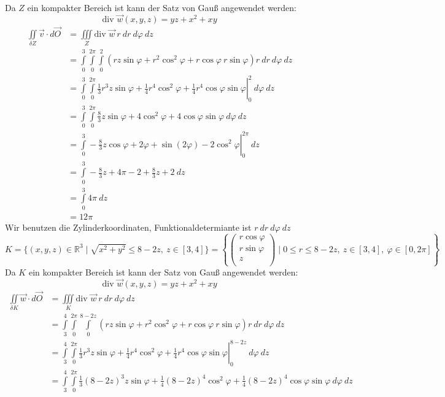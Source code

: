 \documentclass[10pt,a4paper,parskip=half]{scrartcl}
\newcommand{\R}{\mathbb{R}}
\newcommand{\vecthree}[3]{\begin{pmatrix}#1\\#2\\#3\\\end {pmatrix}}
\begin{document}
\begin{enumerate}[(a)]
   Da $Z$ ein kompakter Bereich ist kann der Satz von Gauß angewendet werden:
   \[ \text{div } \vec w(x,y,z) =  yz + x^2 + xy\]
      \begin{align*}
            \iint\limits_{\delta Z} \vec v \cdot d \vec O &= \iiint\limits_{Z} \text{div } \vec w~ r~dr ~d\varphi~ dz \\
            &= \int\limits_{0}^3\int\limits_0^{2\pi}\int\limits_0^2  (rz\sin\varphi + r^2\cos^2\varphi + r\cos\varphi ~r\sin\varphi )r~dr ~d\varphi~ dz \\
            &= \left.\int\limits_{0}^3\int\limits_0^{2\pi}  \frac 13 r^3z \sin \varphi + \frac 14 r^4 \cos^2 \varphi + \frac 14 r^4 \cos \varphi \sin \varphi \right|^2_0  ~d\varphi ~ dz  \\
            &= \int\limits_{0}^3\int\limits_0^{2\pi} \frac 83 z \sin \varphi + 4\cos^2 \varphi + 4\cos \varphi \sin \varphi ~d\varphi ~dz \\
            &= \left.\int\limits_0^3 -\frac 83  z \cos \varphi + 2\varphi + \sin (2\varphi ) - 2\cos^2\varphi \right|^{2\pi}_0 ~dz\\
            &= \int\limits_0^3 - \frac 83 z + 4\pi - 2 + \frac 83z + 2 ~dz \\
            &= \int\limits_0^3  4\pi ~dz \\
            &= 12\pi
      \end{align*}
Wir benutzen die Zylinderkoordinaten, Funktionaldetermiante ist $r~dr ~ d\varphi ~dz$
   \[ K = \{ (x,y,z) \in \R^3  \mid \sqrt{x^2 + y^2} \le 8 - 2z ,~z \in [3,4]\} = \left\{ \vecthree{r \cos \varphi}{r\sin \varphi}{z} \mid 0 \le r \le 8-2z, ~z \in [3,4] ,~ \varphi \in [0,2\pi] \right\} \] 
   Da $K$ ein kompakter Bereich ist kann der Satz von Gauß angewendet werden:
   \[ \text{div } \vec w(x,y,z) =  yz + x^2 + xy\]
      \begin{align*}
            \iint\limits_{\delta K} \vec w \cdot d \vec O &= \iiint\limits_{K} \text{div } \vec w~ r~dr ~d\varphi~ dz \\
            &= \int\limits_{3}^4\int\limits_0^{2\pi}\int\limits_0^{8-2z}  (rz\sin\varphi + r^2\cos^2\varphi + r\cos\varphi ~r\sin\varphi )r~dr ~d\varphi~ dz \\
             &= \left.\int\limits_{3}^4\int\limits_0^{2\pi}  \frac 13 r^3z \sin \varphi + \frac 14 r^4 \cos^2 \varphi + \frac 14 r^4 \cos \varphi \sin \varphi \right|^{8-2z}_0 ~d\varphi~ dz \\
              &= \int\limits_{3}^4\int\limits_0^{2\pi}  \frac 13 (8-2z)^3z\sin \varphi + \frac 14 (8-2z)^4\cos^2\varphi + \frac 14 (8-2z)^4\cos \varphi \sin \varphi  ~d\varphi~ dz \\

\end{align*}
\end{enumerate}
\end{document}
